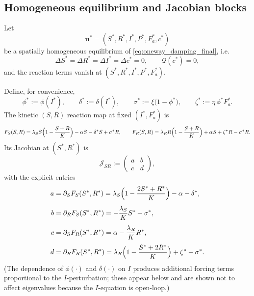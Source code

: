 \documentclass[pdflatex,sn-mathphys-ay]{sn-jnl}
\theoremstyle{thmstyleone}
\theoremstyle{definition}
\theoremstyle{remark}
\begin{document}
\begin{appendices}
\subsection{Homogeneous equilibrium and Jacobian blocks}
Let
\[
\mathbf u^*=(S^*,R^*,I^*,P^*,F_a^*,c^*)
\]
be a spatially homogeneous equilibrium of \eqref{eq:oneway_damping_final}, i.e.
\[
\Delta S^*=\Delta R^*=\Delta I^*=\Delta c^*=0,\qquad
\mathcal Q(c^*)=0,
\]
and the reaction terms vanish at $(S^*,R^*,I^*,P^*,F_a^*)$.

Define, for convenience,
\[
\phi^*:=\phi(I^*),\qquad \delta^*:=\delta(I^*),\qquad \sigma^*:=\xi\bigl(1-\phi^*\bigr),\qquad \zeta^*:=\eta\,\phi^* F_a^*.
\]
The kinetic $(S,R)$ reaction map at fixed $(I^*,F_a^*)$ is
\[
F_S(S,R)=\lambda_S S\Bigl(1-\frac{S+R}{K}\Bigr)-\alpha S-\delta^* S+\sigma^* R,
\qquad
F_R(S,R)=\lambda_R R\Bigl(1-\frac{S+R}{K}\Bigr)+\alpha S+\zeta^* R-\sigma^* R.
\]
Its Jacobian at $(S^*,R^*)$ is
\begin{equation}
\label{eq:JF_SR_appendix}
\mathcal J_{SR}:=
\begin{pmatrix}
a & b\\
c & d
\end{pmatrix},
\end{equation}
with the explicit entries
\begin{align}
\label{eq:abcd_appendix}
\begin{aligned}
a &= \partial_S F_S(S^*,R^*)= \lambda_S\Bigl(1-\frac{2S^*+R^*}{K}\Bigr)-\alpha-\delta^*,\\[4pt]
b &= \partial_R F_S(S^*,R^*)= -\frac{\lambda_S}{K}S^*+\sigma^*,\\[4pt]
c &= \partial_S F_R(S^*,R^*)= \alpha-\frac{\lambda_R}{K}R^*,\\[4pt]
d &= \partial_R F_R(S^*,R^*)= \lambda_R\Bigl(1-\frac{S^*+2R^*}{K}\Bigr)+\zeta^*-\sigma^*.
\end{aligned}
\end{align}
(The dependence of $\phi(\cdot)$ and $\delta(\cdot)$ on $I$ produces additional forcing terms proportional to the $I$-perturbation; these appear below and are shown not to affect eigenvalues because the $I$-equation is open-loop.)


\end{appendices}
\end{document}
